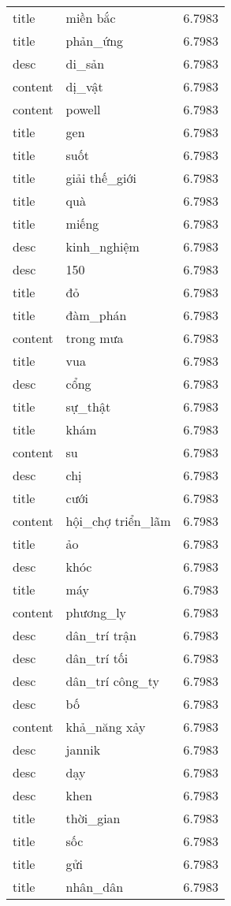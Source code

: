 \documentclass{article}
\begin{document}
\begin{tabular}{lll}
title & miền bắc & 6.7983\\
title & phản\_ứng & 6.7983\\
desc & di\_sản & 6.7983\\
content & dị\_vật & 6.7983\\
content & powell & 6.7983\\
title & gen & 6.7983\\
title & suốt & 6.7983\\
title & giải thế\_giới & 6.7983\\
title & quà & 6.7983\\
title & miếng & 6.7983\\
desc & kinh\_nghiệm & 6.7983\\
desc & 150 & 6.7983\\
title & đỏ & 6.7983\\
title & đàm\_phán & 6.7983\\
content & trong mưa & 6.7983\\
title & vua & 6.7983\\
desc & cổng & 6.7983\\
title & sự\_thật & 6.7983\\
title & khám & 6.7983\\
content & su & 6.7983\\
desc & chị & 6.7983\\
title & cưới & 6.7983\\
content & hội\_chợ triển\_lãm & 6.7983\\
title & ảo & 6.7983\\
desc & khóc & 6.7983\\
title & máy & 6.7983\\
content & phương\_ly & 6.7983\\
desc & dân\_trí trận & 6.7983\\
desc & dân\_trí tối & 6.7983\\
desc & dân\_trí công\_ty & 6.7983\\
desc & bố & 6.7983\\
content & khả\_năng xảy & 6.7983\\
desc & jannik & 6.7983\\
desc & dạy & 6.7983\\
desc & khen & 6.7983\\
title & thời\_gian & 6.7983\\
title & sốc & 6.7983\\
title & gửi & 6.7983\\
title & nhân\_dân & 6.7983\\

\end{tabular}
\end{document}
